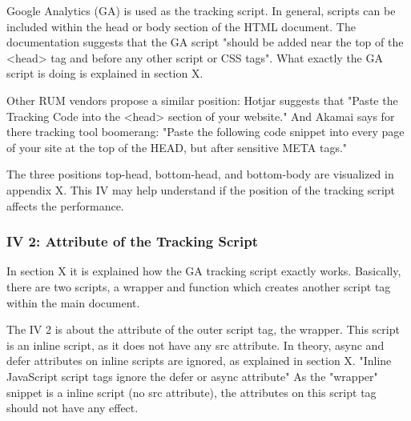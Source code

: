 
Google Analytics (GA) is used as the tracking script.
In general, scripts can be included within the head or body section of the HTML document. %
The documentation suggests that the GA script "should be added near the top of the <head> tag and before any other script or CSS tags".
What exactly the GA script is doing is explained in section X.


Other RUM vendors propose a similar position:
Hotjar suggests that "Paste the Tracking Code into the <head> section of your website."
And Akamai says for there tracking tool boomerang:
"Paste the following code snippet into every page of your site at the top of the HEAD, but after sensitive META tags."

The three positions top-head, bottom-head, and bottom-body are visualized in appendix X.
This IV may help understand if the position of the tracking script affects the performance.







\subsubsection{IV 2: Attribute of the Tracking Script}


In section X it is explained how the GA tracking script exactly works.
Basically, there are two scripts, a wrapper and function which creates another script tag within the main document.

The IV 2 is about the attribute of the outer script tag, the wrapper.
This script is an inline script, as it does not have any src attribute.
In theory,  async and defer attributes on inline scripts are ignored, as explained in section X.
"Inline JavaScript script tags ignore the defer or async attribute"
As the "wrapper" snippet is a inline script (no src attribute), the attributes on this script tag should not have any effect.

